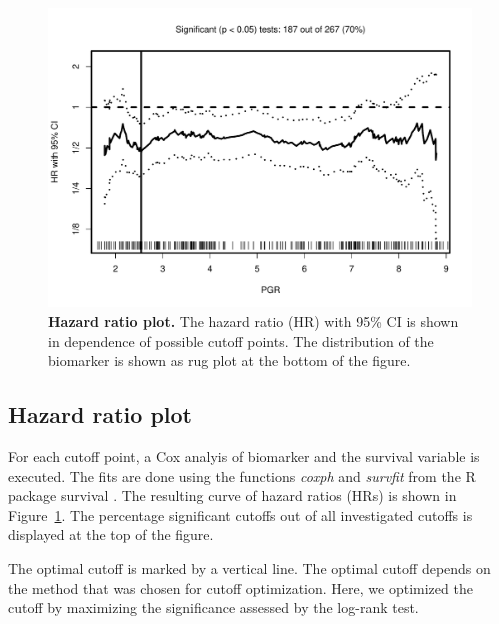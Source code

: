 \documentclass[12pt, a4paper]{article}
\begin{document}
\newpage

\begin{figure}[t]
\centering
\includegraphics{Cutoff_Finder_manual-005}
\caption{\textbf{Hazard ratio plot.}
The hazard ratio (HR) with 95\% CI is shown in dependence of possible cutoff points.
The distribution of the biomarker is shown as rug plot at the bottom of the figure.}
\label{fig:hr}
\end{figure}

\subsection{Hazard ratio plot}
For each cutoff point, a Cox analyis of biomarker and the survival variable is executed.
The fits are done using the functions \emph{coxph} and \emph{survfit} from the R package survival \cite{survival}.
The resulting curve of hazard ratios (HRs) is shown in Figure~\ref{fig:hr}.
The percentage significant cutoffs out of all investigated cutoffs is displayed at the top of the figure.

The optimal cutoff is marked by a vertical line.
The optimal cutoff depends on the method that was chosen for cutoff optimization.
Here, we optimized the cutoff by maximizing the significance assessed by the log-rank test.

\newpage
\end{document}
